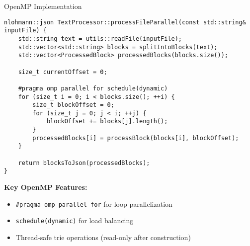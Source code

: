 \documentclass[aspectratio=169]{beamer}
\begin{document}
\begin{frame}[fragile]{OpenMP Implementation}
\begin{lstlisting}[caption=Parallel Processing Code]
nlohmann::json TextProcessor::processFileParallel(const std::string& inputFile) {
    std::string text = utils::readFile(inputFile);
    std::vector<std::string> blocks = splitIntoBlocks(text);
    std::vector<ProcessedBlock> processedBlocks(blocks.size());
    
    size_t currentOffset = 0;
    
    #pragma omp parallel for schedule(dynamic)
    for (size_t i = 0; i < blocks.size(); ++i) {
        size_t blockOffset = 0;
        for (size_t j = 0; j < i; ++j) {
            blockOffset += blocks[j].length();
        }
        processedBlocks[i] = processBlock(blocks[i], blockOffset);
    }
    
    return blocksToJson(processedBlocks);
}
\end{lstlisting}

\textbf{Key OpenMP Features:}
\begin{itemize}
    \item \texttt{\#pragma omp parallel for} for loop parallelization
    \item \texttt{schedule(dynamic)} for load balancing
    \item Thread-safe trie operations (read-only after construction)
\end{itemize}
\end{frame}
\end{document}
